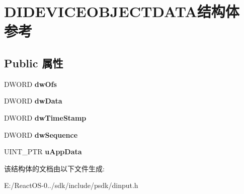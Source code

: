 \hypertarget{struct_d_i_d_e_v_i_c_e_o_b_j_e_c_t_d_a_t_a}{}\section{D\+I\+D\+E\+V\+I\+C\+E\+O\+B\+J\+E\+C\+T\+D\+A\+T\+A结构体 参考}
\label{struct_d_i_d_e_v_i_c_e_o_b_j_e_c_t_d_a_t_a}
\subsection*{Public 属性}
\begin{DoxyCompactItemize}
\item 
\mbox{\label{struct_d_i_d_e_v_i_c_e_o_b_j_e_c_t_d_a_t_a_aae1e5fed39377aafd65e67169837a24e}} 
D\+W\+O\+RD {\bfseries dw\+Ofs}
\item 
\mbox{\label{struct_d_i_d_e_v_i_c_e_o_b_j_e_c_t_d_a_t_a_a724475149bad1d223655dfaa951fdc31}} 
D\+W\+O\+RD {\bfseries dw\+Data}
\item 
\mbox{\label{struct_d_i_d_e_v_i_c_e_o_b_j_e_c_t_d_a_t_a_a4798874752181126bd321e71d330927c}} 
D\+W\+O\+RD {\bfseries dw\+Time\+Stamp}
\item 
\mbox{\label{struct_d_i_d_e_v_i_c_e_o_b_j_e_c_t_d_a_t_a_a16e3d6a714eba78c5ab1494c0818b369}} 
D\+W\+O\+RD {\bfseries dw\+Sequence}
\item 
\mbox{\label{struct_d_i_d_e_v_i_c_e_o_b_j_e_c_t_d_a_t_a_a367ee5cdcf4af6e3428517fa7055dd57}} 
U\+I\+N\+T\+\_\+\+P\+TR {\bfseries u\+App\+Data}
\end{DoxyCompactItemize}


该结构体的文档由以下文件生成\+:\begin{DoxyCompactItemize}
\item 
E\+:/\+React\+O\+S-\/0../sdk/include/psdk/dinput.\+h\end{DoxyCompactItemize}
